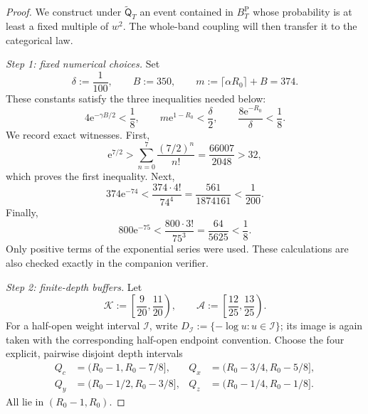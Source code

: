 \documentclass[11pt]{article}
\numberwithin{equation}{section}
\theoremstyle{plain}
\newcommand{\1}{\mathbf 1}
\newcommand{\e}{\mathrm e}
\begin{document}
\begin{proof}
We construct under $\widetilde{\mathsf Q}_T$ an event contained in
$B_T^{\mathrm P}$ whose probability is at least a fixed multiple of $w^2$.
The whole-band coupling will then transfer it to the categorical law.

\smallskip
\noindent\emph{Step 1: fixed numerical choices.}
Set
\begin{equation}\label{eq:first-moment-constants}
 \delta:=\frac1{100},
 \qquad
 B:=350,
 \qquad
 m:=\lceil\alpha R_0\rceil+B=374.
\end{equation}
These constants satisfy the three inequalities needed below:
\begin{equation}\label{eq:constant-certificate}
 4\e^{-\gamma B/2}<\frac18,
 \qquad
 m\e^{1-R_0}<\frac{\delta}{2},
 \qquad
 \frac{8\e^{-R_0}}{\delta}<\frac18.
\end{equation}
We record exact witnesses.  First,
\[
 \e^{7/2}>
 \sum_{n=0}^{7}\frac{(7/2)^n}{n!}
 =\frac{66007}{2048}>32,
\]
which proves the first inequality.  Next,
\[
 374\e^{-74}
 <\frac{374\cdot4!}{74^4}
 =\frac{561}{1874161}<\frac1{200}.
\]
Finally,
\[
 800\e^{-75}
 <\frac{800\cdot3!}{75^3}
 =\frac{64}{5625}<\frac18.
\]
Only positive terms of the exponential series were used.  These
calculations are also checked exactly in the companion verifier.

\smallskip
\noindent\emph{Step 2: finite-depth buffers.}
Let
\[
 \mathcal K:=\left[\frac9{20},\frac{11}{20}\right),
 \qquad
 \mathcal A:=\left[\frac{12}{25},\frac{13}{25}\right).
\]
For a half-open weight interval $\mathcal I$, write
$D_{\mathcal I}:=\{-\log u:u\in\mathcal I\}$; its image is again taken
with the corresponding half-open endpoint convention.  Choose the four
explicit, pairwise disjoint depth intervals
\begin{align*}
 Q_c&=(R_0-1,R_0-7/8],&
 Q_x&=(R_0-3/4,R_0-5/8],\\
 Q_y&=(R_0-1/2,R_0-3/8],&
 Q_z&=(R_0-1/4,R_0-1/8].
\end{align*}
All lie in $(R_0-1,R_0)$.


\end{proof}
\end{document}
